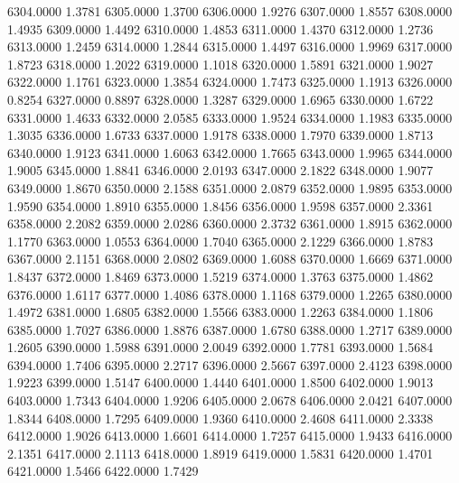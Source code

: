 6304.0000      1.3781
6305.0000      1.3700
6306.0000      1.9276
6307.0000      1.8557
6308.0000      1.4935
6309.0000      1.4492
6310.0000      1.4853
6311.0000      1.4370
6312.0000      1.2736
6313.0000      1.2459
6314.0000      1.2844
6315.0000      1.4497
6316.0000      1.9969
6317.0000      1.8723
6318.0000      1.2022
6319.0000      1.1018
6320.0000      1.5891
6321.0000      1.9027
6322.0000      1.1761
6323.0000      1.3854
6324.0000      1.7473
6325.0000      1.1913
6326.0000      0.8254
6327.0000      0.8897
6328.0000      1.3287
6329.0000      1.6965
6330.0000      1.6722
6331.0000      1.4633
6332.0000      2.0585
6333.0000      1.9524
6334.0000      1.1983
6335.0000      1.3035
6336.0000      1.6733
6337.0000      1.9178
6338.0000      1.7970
6339.0000      1.8713
6340.0000      1.9123
6341.0000      1.6063
6342.0000      1.7665
6343.0000      1.9965
6344.0000      1.9005
6345.0000      1.8841
6346.0000      2.0193
6347.0000      2.1822
6348.0000      1.9077
6349.0000      1.8670
6350.0000      2.1588
6351.0000      2.0879
6352.0000      1.9895
6353.0000      1.9590
6354.0000      1.8910
6355.0000      1.8456
6356.0000      1.9598
6357.0000      2.3361
6358.0000      2.2082
6359.0000      2.0286
6360.0000      2.3732
6361.0000      1.8915
6362.0000      1.1770
6363.0000      1.0553
6364.0000      1.7040
6365.0000      2.1229
6366.0000      1.8783
6367.0000      2.1151
6368.0000      2.0802
6369.0000      1.6088
6370.0000      1.6669
6371.0000      1.8437
6372.0000      1.8469
6373.0000      1.5219
6374.0000      1.3763
6375.0000      1.4862
6376.0000      1.6117
6377.0000      1.4086
6378.0000      1.1168
6379.0000      1.2265
6380.0000      1.4972
6381.0000      1.6805
6382.0000      1.5566
6383.0000      1.2263
6384.0000      1.1806
6385.0000      1.7027
6386.0000      1.8876
6387.0000      1.6780
6388.0000      1.2717
6389.0000      1.2605
6390.0000      1.5988
6391.0000      2.0049
6392.0000      1.7781
6393.0000      1.5684
6394.0000      1.7406
6395.0000      2.2717
6396.0000      2.5667
6397.0000      2.4123
6398.0000      1.9223
6399.0000      1.5147
6400.0000      1.4440
6401.0000      1.8500
6402.0000      1.9013
6403.0000      1.7343
6404.0000      1.9206
6405.0000      2.0678
6406.0000      2.0421
6407.0000      1.8344
6408.0000      1.7295
6409.0000      1.9360
6410.0000      2.4608
6411.0000      2.3338
6412.0000      1.9026
6413.0000      1.6601
6414.0000      1.7257
6415.0000      1.9433
6416.0000      2.1351
6417.0000      2.1113
6418.0000      1.8919
6419.0000      1.5831
6420.0000      1.4701
6421.0000      1.5466
6422.0000      1.7429
